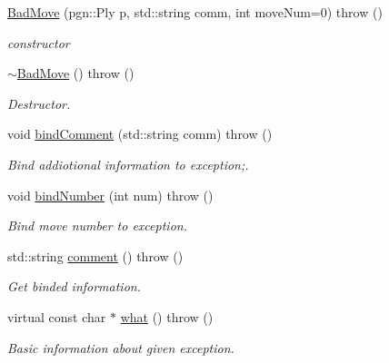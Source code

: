 \begin{DoxyCompactItemize}
\item 
\hyperlink{classChEngn_1_1BadMove_a581052f5203836b164bf25ce6e3e6b7a}{BadMove} (pgn::Ply p, std::string comm, int moveNum=0)  throw ()
\begin{DoxyCompactList}\small\item\em constructor \item\end{DoxyCompactList}\item 
\hypertarget{classChEngn_1_1BadMove_a6efb8ca7c4af455b042eddf7ebbf2837}{
\hyperlink{classChEngn_1_1BadMove_a6efb8ca7c4af455b042eddf7ebbf2837}{$\sim$BadMove} ()  throw ()}
\label{classChEngn_1_1BadMove_a6efb8ca7c4af455b042eddf7ebbf2837}

\begin{DoxyCompactList}\small\item\em Destructor. \item\end{DoxyCompactList}\item 
void \hyperlink{classChEngn_1_1BadMove_a0006497750a3d96218b1dad586f5f8f1}{bindComment} (std::string comm)  throw ()
\begin{DoxyCompactList}\small\item\em Bind addiotional information to exception;. \item\end{DoxyCompactList}\item 
void \hyperlink{classChEngn_1_1BadMove_a1de119e2f1144a0e6906940df02bdaf8}{bindNumber} (int num)  throw ()
\begin{DoxyCompactList}\small\item\em Bind move number to exception. \item\end{DoxyCompactList}\item 
\hypertarget{classChEngn_1_1BadMove_a89df0bcb37e85792fd07e253503b4038}{
std::string \hyperlink{classChEngn_1_1BadMove_a89df0bcb37e85792fd07e253503b4038}{comment} ()  throw ()}
\label{classChEngn_1_1BadMove_a89df0bcb37e85792fd07e253503b4038}

\begin{DoxyCompactList}\small\item\em Get binded information. \item\end{DoxyCompactList}\item 
\hypertarget{classChEngn_1_1BadMove_ae7c3114036a9917a5aef4458a8f567d3}{
virtual const char $\ast$ \hyperlink{classChEngn_1_1BadMove_ae7c3114036a9917a5aef4458a8f567d3}{what} ()  throw ()}
\label{classChEngn_1_1BadMove_ae7c3114036a9917a5aef4458a8f567d3}

\begin{DoxyCompactList}\small\item\em Basic information about given exception. \item\end{DoxyCompactList}\end{DoxyCompactItemize}


